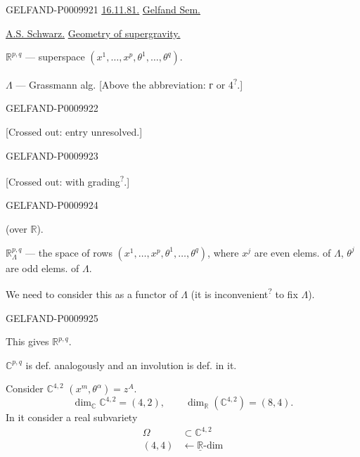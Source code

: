 \begin{GelfandAdjacentEvidence}{GELFAND-P000992}{1}
\underline{\underline{16.11.81.}} \qquad \underline{Gelfand Sem.}

\underline{\underline{A.S. Schwarz.}} \qquad \underline{Geometry of supergravity.}

$\mathbb R^{p,q}$ --- superspace\qquad
$(x^1,\ldots,x^p,\theta^1,\ldots,\theta^q)$.

$\Lambda$ --- Grassmann alg.
[Above the abbreviation: г or 4\textsuperscript{?}.]
\end{GelfandAdjacentEvidence}
\begin{GelfandAdjacentEvidence}{GELFAND-P000992}{2}

[Crossed out: entry unresolved.]
\end{GelfandAdjacentEvidence}
\begin{GelfandAdjacentEvidence}{GELFAND-P000992}{3}

[Crossed out: with grading\textsuperscript{?}.]
\end{GelfandAdjacentEvidence}
\begin{GelfandAdjacentEvidence}{GELFAND-P000992}{4}

(over $\mathbb R$).

$\mathbb R^{p,q}_{\Lambda}$ --- the space of rows
$(x^1,\ldots,x^p,\theta^1,\ldots,\theta^q)$,
where $x^j$ are even elems. of $\Lambda$, $\theta^j$ are odd elems. of $\Lambda$.

We need to consider this as a functor of $\Lambda$ (it is inconvenient\textsuperscript{?} to fix $\Lambda$).
\end{GelfandAdjacentEvidence}
\begin{GelfandAdjacentEvidence}{GELFAND-P000992}{5}


This gives $\mathbb R^{p,q}$.

$\mathbb C^{p,q}$ is def. analogously and an involution is def. in it.

\medskip
Consider $\mathbb C^{4,2}$ \qquad $(x^m,\theta^\alpha)=z^A$.
\[
\dim_{\mathbb C}\mathbb C^{4,2}=(4,2),\qquad
\dim_{\mathbb R}(\mathbb C^{4,2})=(8,4).
\]
In it consider a real subvariety
\[
\begin{array}{cl}
\Omega & \subset\mathbb C^{4,2}\\[-1pt]
(4,4)&\leftarrow\underline{\mathbb R}\text{-dim}
\end{array}
\]
\end{GelfandAdjacentEvidence}


